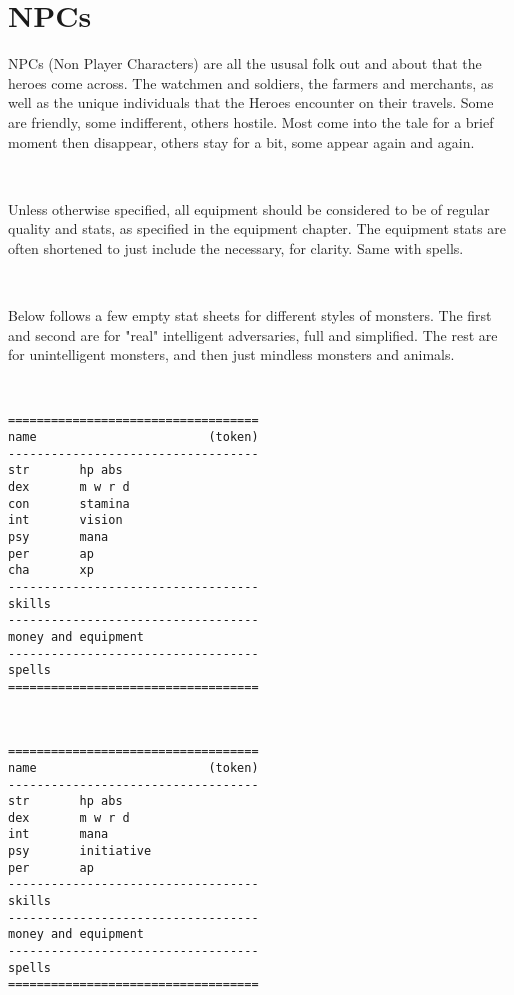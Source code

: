 

\cleardoublepage

\chapter*{NPCs}

NPCs (Non Player Characters) are all the ususal folk out and about that the heroes come across. The watchmen and soldiers, the farmers and merchants, as well as the unique individuals that the Heroes encounter on their travels. Some are friendly, some indifferent, others hostile. Most come into the tale for a brief moment then disappear, others stay for a bit, some appear again and again.

\

Unless otherwise specified, all equipment should be considered to be of regular quality and stats, as specified in the equipment chapter. The equipment stats are often shortened to just include the necessary, for clarity. Same with spells.

\

Below follows a few empty stat sheets for different styles of monsters. The first and second are for "real" intelligent adversaries, full and simplified. The rest are for unintelligent monsters, and then just mindless monsters and animals.

\

\goodbreak \begin{samepage} \small \begin{verbatim}
===================================
name                        (token)
-----------------------------------
str       hp abs
dex       m w r d
con       stamina
int       vision
psy       mana
per       ap
cha       xp
-----------------------------------
skills
-----------------------------------
money and equipment
-----------------------------------
spells
===================================
\end{verbatim} \normalsize \end{samepage}

\

\goodbreak \begin{samepage} \small \begin{verbatim}
===================================
name                        (token)
-----------------------------------
str       hp abs
dex       m w r d
int       mana
psy       initiative
per       ap
-----------------------------------
skills
-----------------------------------
money and equipment
-----------------------------------
spells
===================================
\end{verbatim} \normalsize \end{samepage}

